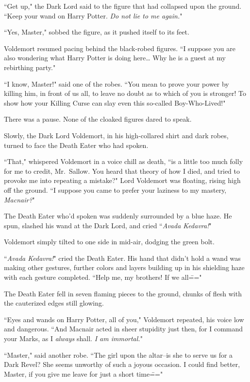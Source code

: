 ``Get up," the Dark Lord said to the figure that had collapsed upon the ground. ``Keep your wand on Harry Potter. \emph{Do not lie to me again.}"

``Yes, Master," sobbed the figure, as it pushed itself to its feet.

Voldemort resumed pacing behind the black-robed figures. ``I suppose you are also wondering what Harry Potter is doing here{\ldots} Why he is a guest at my rebirthing party."

``I know, Master!" said one of the robes. ``You mean to prove your power by killing him, in front of us all, to leave no doubt as to which of you is stronger! To show how your Killing Curse can slay even this so-called Boy-Who-Lived!"

There was a pause. None of the cloaked figures dared to speak.

Slowly, the Dark Lord Voldemort, in his high-collared shirt and dark robes, turned to face the Death Eater who had spoken.

``That," whispered Voldemort in a voice chill as death, ``is a little too much folly for me to credit, Mr.~Sallow. You heard that theory of how I died, and tried to provoke me into repeating a mistake?" Lord Voldemort was floating, rising high off the ground. ``I suppose you came to prefer your laziness to my mastery, \emph{Macnair?}"

The Death Eater who'd spoken was suddenly surrounded by a blue haze. He spun, slashed his wand at the Dark Lord, and cried ``\emph{Avada Kedavra!}"

Voldemort simply tilted to one side in mid-air, dodging the green bolt.

``\emph{Avada Kedavra!}" cried the Death Eater. His hand that didn't hold a wand was making other gestures, further colors and layers building up in his shielding haze with each gesture completed. ``Help me, my brothers! If we all\==="

The Death Eater fell in seven flaming pieces to the ground, chunks of flesh with the cauterized edges still glowing.

``Eyes and wands on Harry Potter, all of you," Voldemort repeated, his voice low and dangerous. ``And Macnair acted in sheer stupidity just then, for I command your Marks, as I \emph{always} shall. \emph{I am immortal.}"

``Master," said another robe. ``The girl upon the altar\---is she to serve us for a Dark Revel? She seems unworthy of such a joyous occasion. I could find better, Master, if you give me leave for just a short time\==="

